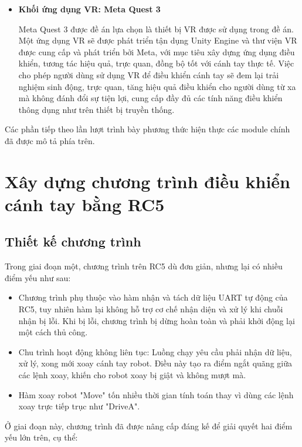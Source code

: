 \begin{itemize}
    \item \textbf{Khối ứng dụng VR: Meta Quest 3}

    Meta Quest 3 được đề án lựa chọn là thiết bị VR được sử dụng trong đề án. Một ứng dụng VR sẽ được phát triển tận dụng Unity Engine và thư viện VR được cung cấp và phát triển bởi Meta, với mục tiêu xây dựng ứng dụng điều khiển, tương tác hiệu quả, trực quan, đồng bộ tốt với cánh tay thực tế. Việc cho phép người dùng sử dụng VR để điều khiển cánh tay sẽ đem lại trải nghiệm sinh động, trực quan, tăng hiệu quả điều khiển cho người dùng từ xa mà không đánh đổi sự tiện lợi, cung cấp đầy đủ các tính năng điều khiển thông dụng như trên thiết bị truyền thống.
\end{itemize}

Các phần tiếp theo lần lượt trình bày phương thức hiện thực các module chính đã được mô tả phía trên.

\section{Xây dựng chương trình điều khiển cánh tay bằng RC5}

\subsection{Thiết kế chương trình}

Trong giai đoạn một, chương trình trên RC5 dù đơn giản, nhưng lại có nhiều điểm yếu như sau:
\begin{itemize}
    \item Chương trình phụ thuộc vào hàm nhận và tách dữ liệu UART tự động của RC5, tuy nhiên hàm lại không hỗ trợ cơ chế nhận diện và xử lý khi chuỗi nhận bị lỗi. Khi bị lỗi, chương trình bị dừng hoàn toàn và phải khởi động lại một cách thủ công.
    \item Chu trình hoạt động không liên tục: Luồng chạy yêu cầu phải nhận dữ liệu, xử lý, xong mới xoay cánh tay robot. Điều này tạo ra điểm ngắt quãng giữa các lệnh xoay, khiến cho robot xoay bị giật và không mượt mà.
    \item Hàm xoay robot "Move" tốn nhiều thời gian tính toán thay vì dùng các lệnh xoay trực tiếp trục như "DriveA".
\end{itemize}

Ở giai đoạn này, chương trình đã được nâng cấp đáng kế để giải quyết hai điểm yếu lớn trên, cụ thể:

